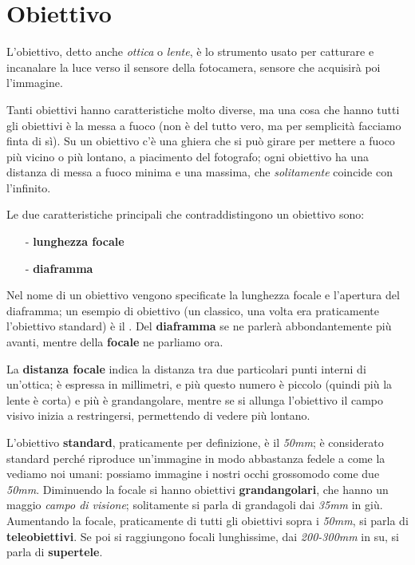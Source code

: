 \section{Obiettivo}

L'obiettivo, detto anche \textit{ottica} o \textit{lente}, è lo strumento usato per catturare e incanalare la
luce verso il sensore della fotocamera, sensore che acquisirà poi l'immagine.

Tanti obiettivi hanno caratteristiche molto diverse, ma una cosa che hanno tutti gli
obiettivi è la messa a fuoco (non è del tutto vero, ma per semplicità facciamo finta di sì).
Su un obiettivo c'è una ghiera che si può girare per mettere a fuoco più vicino o più
lontano, a piacimento del fotografo; ogni obiettivo ha una distanza di messa a fuoco
minima e una massima, che \textit{solitamente} coincide con l'infinito.

Le due caratteristiche principali che contraddistingono un obiettivo sono:
\begin{itemize}
    \item[-] \textbf{lunghezza focale}
    \item[-] \textbf{diaframma} 
\end{itemize}

Nel nome di un obiettivo vengono specificate la lunghezza focale e l'apertura del diaframma; un esempio di obiettivo (un classico, una volta era praticamente l'obiettivo standard) è il .\newline
Del \textbf{diaframma} se ne parlerà abbondantemente più avanti, mentre della \textbf{focale} ne parliamo ora.

La \textbf{distanza focale} indica la distanza tra due particolari punti interni di un'ottica; è
espressa in millimetri, e più questo numero è piccolo (quindi più la lente è corta) e più è
grandangolare, mentre se si allunga l'obiettivo il campo visivo inizia a restringersi,
permettendo di vedere più lontano.

L'obiettivo \textbf{standard}, praticamente per definizione, è il \textit{50mm}; è considerato standard perché riproduce un'immagine in modo abbastanza fedele a come la vediamo noi umani:
possiamo immagine i nostri occhi grossomodo come due \textit{50mm}.\newline
Diminuendo la focale si hanno obiettivi \textbf{grandangolari}, che hanno un maggio \textit{campo di visione}; solitamente si parla di grandagoli dai \textit{35mm} in giù.\newline
Aumentando la focale, praticamente di tutti gli obiettivi sopra i \textit{50mm}, si parla di \textbf{teleobiettivi}. Se poi si raggiungono focali lunghissime, dai \textit{200-300mm} in su, si parla di \textbf{supertele}.

